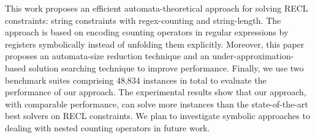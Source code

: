 %

This work proposes an efficient automata-theoretical approach for solving RECL constraints: string constraints with regex-counting and string-length. The approach is based on encoding counting operators in regular expressions by registers symbolically instead of unfolding them explicitly. Moreover, this paper proposes an automata-size reduction technique and an under-approximation-based solution searching technique to improve performance. Finally, we use two benchmark suites comprising 48,834 instances in total to evaluate the performance of our approach. The experimental results show that our approach, with comparable performance, can solve more instances than the state-of-the-art best solvers on RECL constraints. We plan to investigate symbolic approaches to dealing with nested counting operators in future work. 




%